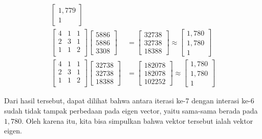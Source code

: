 \documentclass{article}
\begin{document}
\begin{align}
\begin{bmatrix}
        1,779\\
        1
    \end{bmatrix}\\
        \begin{bmatrix}
        4 & 1 & 1\\
        2 & 3 & 1\\
        1 & 1 & 2\\
    \end{bmatrix}
    \begin{bmatrix}
        5886\\
        5886\\
        3308
    \end{bmatrix}
    &=
    \begin{bmatrix}
        32738\\
        32738\\
        18388
    \end{bmatrix}
    \approx
    \begin{bmatrix}
        1,780\\
        1,780\\
        1
    \end{bmatrix}\\
        \begin{bmatrix}
        4 & 1 & 1\\
        2 & 3 & 1\\
        1 & 1 & 2\\
    \end{bmatrix}
    \begin{bmatrix}
        32738\\
        32738\\
        18388
    \end{bmatrix}
    &=
    \begin{bmatrix}
        182078\\
        182078\\
        102252
    \end{bmatrix}
    \approx
    \begin{bmatrix}
        1,780\\
        1,780\\
        1
    \end{bmatrix}
\end{align}

Dari hasil tersebut, dapat dilihat bahwa antara iterasi ke-7 dengan interasi ke-6 sudah tidak tampak perbedaan pada eigen vector, yaitu sama-sama berada pada $1,780$. Oleh karena itu, kita bisa simpulkan bahwa vektor tersebut ialah vektor eigen.
\end{document}
